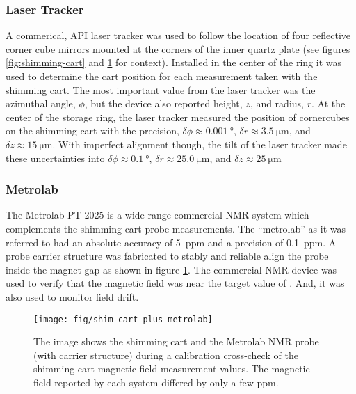 \subsubsection{Laser Tracker}
A commerical, API laser tracker was used to follow the location of four reflective corner cube mirrors mounted at the corners of the inner quartz plate (see figures \ref{fig:shimming-cart} and \ref{fig:shim-cart-plus-metrolab} for context). Installed in the center of the ring it was used to determine the cart position for each measurement taken with the shimming cart.  The most important value from the laser tracker was the azimuthal angle, $\phi$, but the device also reported height, $z$, and radius, $r$.  At the center of the storage ring, the laser tracker measured the position of cornercubes on the shimming cart with the precision, $\delta\phi \approx \SI{0.001}{\degree}$, $\delta r \approx \SI{3.5}{\micro\meter}$, and $\delta z \approx \SI{15}{\micro\meter}$.  With imperfect alignment though, the tilt of the laser tracker made these uncertainties into $\delta\phi \approx \SI{0.1}{\degree}$, $\delta r \approx \SI{25.0}{\micro\meter}$, and $\delta z \approx \SI{25}{\micro\meter}$

\subsubsection{Metrolab}
The Metrolab PT 2025 is a wide-range commercial NMR system which complements the shimming cart probe measurements.  The ``metrolab'' as it was referred to had an absolute accuracy of \SI{5}{ppm} and a precision of \SI{0.1}{ppm}.  A probe carrier structure was fabricated to stably and reliable align the probe inside the magnet gap as shown in figure \ref{fig:shim-cart-plus-metrolab}.  The commercial NMR device was used to verify that the magnetic field was near the target value of \bmagic.  And, it was also used to monitor field drift.

\begin{figure}
\centering
\texttt{[image: fig/shim-cart-plus-metrolab]}
\caption{
    The image shows the shimming cart and the Metrolab NMR probe (with carrier structure) during a calibration cross-check of the shimming cart magnetic field measurement values.  The magnetic field reported by each system differed by only a few ppm.
    \label{fig:shim-cart-plus-metrolab}
}
\end{figure}

